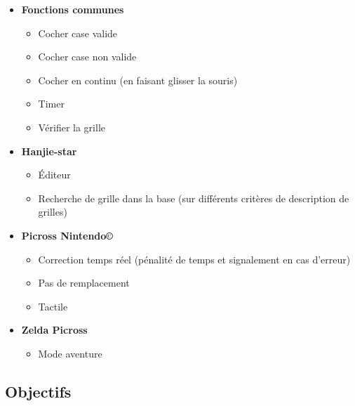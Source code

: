 \documentclass[a4paper, 12pt, twoside]{article}
\begin{document}
\begin{itemize}\setlength{\itemsep}{5mm}

  \item[\textbullet] \large\textbf{Fonctions communes\newline}
  
  \begin{itemize}\setlength{\itemsep}{2mm}
  \item Cocher case valide
  \item Cocher case non valide
  \item Cocher en continu (en faisant glisser la souris)
  \item Timer
  \item Vérifier la grille
 \end{itemize}

 \item[\textbullet] \large\textbf{Hanjie-star\newline}
 
 \begin{itemize}\setlength{\itemsep}{2mm}
  \item Éditeur
  \item Recherche de grille dans la base (sur différents critères de description de grilles)\newline
 \end{itemize}

 \item[\textbullet] \large\textbf{Picross Nintendo\copyright\newline}
 
 \begin{itemize}\setlength{\itemsep}{2mm}
  \item Correction temps réel (pénalité de temps et signalement en cas d'erreur)
  \item Pas de remplacement
  \item Tactile
 \end{itemize}
 
 \item[\textbullet] \large\textbf{Zelda Picross\newline}
 
 \begin{itemize}\setlength{\itemsep}{2mm}
  \item Mode aventure
 \end{itemize}
 
\end{itemize}

\subsection{Objectifs}
\end{document}

